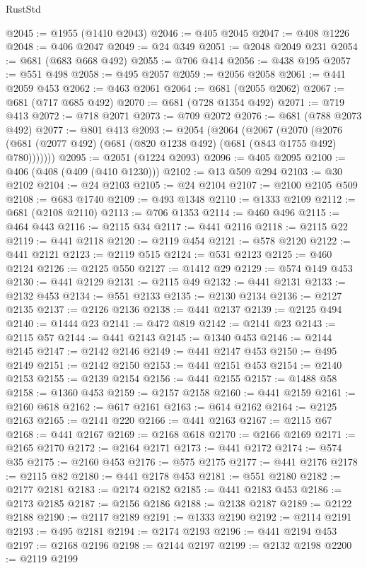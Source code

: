 \begin{lexlean}{RustStd}
\begin{coremodule}
@2045 := @1955 (@1410 @2043)
@2046 := @405 @2045
@2047 := @408 @1226
@2048 := @406 @2047
@2049 := @24 @349
@2051 := @2048 @2049 @231
@2054 := @681 (@683 @668 @492)
@2055 := @706 @414
@2056 := @438 @195
@2057 := @551 @498
@2058 := @495 @2057
@2059 := @2056 @2058
@2061 := @441 @2059 @453
@2062 := @463 @2061
@2064 := @681 (@2055 @2062)
@2067 := @681 (@717 @685 @492)
@2070 := @681 (@728 @1354 @492)
@2071 := @719 @413
@2072 := @718 @2071
@2073 := @709 @2072
@2076 := @681 (@788 @2073 @492)
@2077 := @801 @413
@2093 := @2054
    (@2064
      (@2067
        (@2070 (@2076 (@681 (@2077 @492) (@681 (@820 @1238 @492) (@681 (@843 @1755 @492) @780)))))))
@2095 := @2051 (@1224 @2093)
@2096 := @405 @2095
@2100 := @406 (@408 (@409 (@410 @1230)))
@2102 := @13 @509 @294
@2103 := @30 @2102
@2104 := @24 @2103
@2105 := @24 @2104
@2107 := @2100 @2105 @509
@2108 := @683 @1740
@2109 := @493 @1348
@2110 := @1333 @2109
@2112 := @681 (@2108 @2110)
@2113 := @706 @1353
@2114 := @460 @496
@2115 := @464 @443
@2116 := @2115 @34
@2117 := @441 @2116
@2118 := @2115 @22
@2119 := @441 @2118
@2120 := @2119 @454
@2121 := @578 @2120
@2122 := @441 @2121
@2123 := @2119 @515
@2124 := @531 @2123
@2125 := @460 @2124
@2126 := @2125 @550
@2127 := @1412 @29
@2129 := @574 @149 @453
@2130 := @441 @2129
@2131 := @2115 @49
@2132 := @441 @2131
@2133 := @2132 @453
@2134 := @551 @2133
@2135 := @2130 @2134
@2136 := @2127 @2135
@2137 := @2126 @2136
@2138 := @441 @2137
@2139 := @2125 @494
@2140 := @1444 @23
@2141 := @472 @819
@2142 := @2141 @23
@2143 := @2115 @57
@2144 := @441 @2143
@2145 := @1340 @453
@2146 := @2144 @2145
@2147 := @2142 @2146
@2149 := @441 @2147 @453
@2150 := @495 @2149
@2151 := @2142 @2150
@2153 := @441 @2151 @453
@2154 := @2140 @2153
@2155 := @2139 @2154
@2156 := @441 @2155
@2157 := @1488 @58
@2158 := @1360 @453
@2159 := @2157 @2158
@2160 := @441 @2159
@2161 := @2160 @618
@2162 := @617 @2161
@2163 := @614 @2162
@2164 := @2125 @2163
@2165 := @2141 @220
@2166 := @441 @2163
@2167 := @2115 @67
@2168 := @441 @2167
@2169 := @2168 @618
@2170 := @2166 @2169
@2171 := @2165 @2170
@2172 := @2164 @2171
@2173 := @441 @2172
@2174 := @574 @35
@2175 := @2160 @453
@2176 := @575 @2175
@2177 := @441 @2176
@2178 := @2115 @82
@2180 := @441 @2178 @453
@2181 := @551 @2180
@2182 := @2177 @2181
@2183 := @2174 @2182
@2185 := @441 @2183 @453
@2186 := @2173 @2185
@2187 := @2156 @2186
@2188 := @2138 @2187
@2189 := @2122 @2188
@2190 := @2117 @2189
@2191 := @1333 @2190
@2192 := @2114 @2191
@2193 := @495 @2181
@2194 := @2174 @2193
@2196 := @441 @2194 @453
@2197 := @2168 @2196
@2198 := @2144 @2197
@2199 := @2132 @2198
@2200 := @2119 @2199

\end{coremodule}
\end{lexlean}
